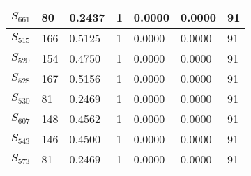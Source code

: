 \begin{xltabular}{\textwidth}{|X|X|X|X|X|X|X|}
 $S_{661}$ & 80 & 0.2437 & 1 & 0.0000 & 0.0000 & 91 \\ \hline
 $S_{515}$ & 166 & 0.5125 & 1 & 0.0000 & 0.0000 & 91 \\ \hline
 $S_{520}$ & 154 & 0.4750 & 1 & 0.0000 & 0.0000 & 91 \\ \hline
 $S_{528}$ & 167 & 0.5156 & 1 & 0.0000 & 0.0000 & 91 \\ \hline
 $S_{530}$ & 81 & 0.2469 & 1 & 0.0000 & 0.0000 & 91 \\ \hline
 $S_{607}$ & 148 & 0.4562 & 1 & 0.0000 & 0.0000 & 91 \\ \hline
 $S_{543}$ & 146 & 0.4500 & 1 & 0.0000 & 0.0000 & 91 \\ \hline
 $S_{573}$ & 81 & 0.2469 & 1 & 0.0000 & 0.0000 & 91 \\ \hline
    \end{xltabular}
    